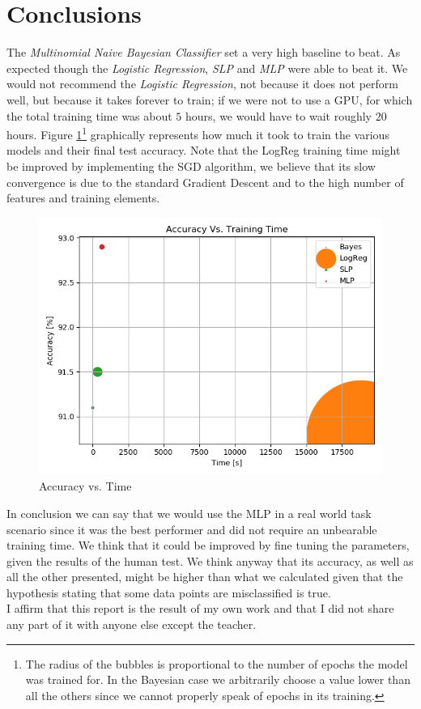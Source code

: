 \documentclass[10pt,a4paper]{report}
\begin{document}
\section{Conclusions}
The \textit{Multinomial Naive Bayesian Classifier} set a very high baseline to beat. As expected though the \textit{Logistic Regression}, \textit{SLP} and \textit{MLP} were able to beat it. We would not recommend the \textit{Logistic Regression}, not because it does not perform well, but because it takes forever to train; if we were not to use a GPU, for which the total training time was about $5$ hours, we would have to wait roughly $20$ hours. Figure \ref{fig:acc_time}\footnote{The radius of the bubbles is proportional to the number of epochs the model was trained for. In the Bayesian case we arbitrarily choose a value lower than all the others since we cannot properly speak of epochs in its training.} graphically represents how much it took to train the various models and their final test accuracy. Note that the LogReg training time might be improved by implementing the SGD algorithm, we believe that its slow convergence is due to the standard Gradient Descent and to the high number of features and training elements.
\begin{figure}[!ht]
\centering
\includegraphics[width=0.5\linewidth]{acc_vs_time.png}
\caption{Accuracy vs. Time}
\label{fig:acc_time}
\end{figure}
In conclusion we can say that we would use the MLP in a real world task scenario since it was the best performer and did not require an unbearable training time. We think that it could be improved by fine tuning the parameters, given the results of the human test. We think anyway that its accuracy, as well as all the other presented, might be higher than what we calculated given that the hypothesis stating that some data points are misclassified is true.
\vspace*{\fill}
\\
I affirm that this report is the result of my own work and that I did not share any part of it with anyone else except the teacher.
\\
\end{document}
